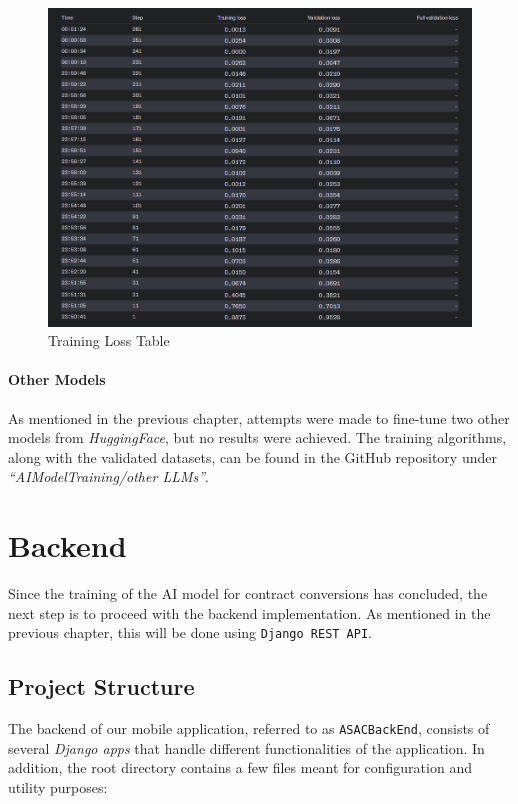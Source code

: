 \begin{figure}[!ht]
    \centering
    \includegraphics[width=1\textwidth]{LATEX/Appendices/Images/Software/AI Model/training_validation_loss_table.png}
    \caption{Training Loss Table}
    \label{fig:training_loss_table}
\end{figure}

\paragraph{Other Models}

As mentioned in the previous chapter, attempts were made to fine-tune two other models from \textit{HuggingFace}, but no results were achieved. The training algorithms, along with the validated datasets, can be found in the GitHub repository under \textit{``AIModelTraining/other LLMs''}.

\section{Backend}

Since the training of the AI model for contract conversions has concluded, the next step is to proceed with the backend implementation. As mentioned in the previous chapter, this will be done using \texttt{Django REST API}. 

\subsection{Project Structure}

The backend of our mobile application, referred to as \texttt{ASACBackEnd}, consists of several \textit{Django apps} that handle different functionalities of the application. In addition, the root directory contains a few files meant for  configuration and utility purposes:

